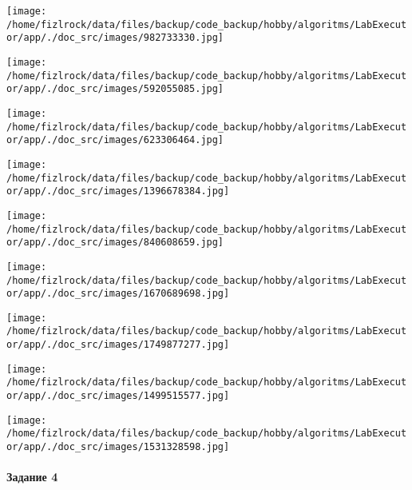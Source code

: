 \documentclass[a4paper, 12pt]{article}
\begin{document}
\texttt{[image: /home/fizlrock/data/files/backup/code\_backup/hobby/algoritms/LabExecutor/app/./doc\_src/images/982733330.jpg]}

\texttt{[image: /home/fizlrock/data/files/backup/code\_backup/hobby/algoritms/LabExecutor/app/./doc\_src/images/592055085.jpg]}

\texttt{[image: /home/fizlrock/data/files/backup/code\_backup/hobby/algoritms/LabExecutor/app/./doc\_src/images/623306464.jpg]}

\texttt{[image: /home/fizlrock/data/files/backup/code\_backup/hobby/algoritms/LabExecutor/app/./doc\_src/images/1396678384.jpg]}

\texttt{[image: /home/fizlrock/data/files/backup/code\_backup/hobby/algoritms/LabExecutor/app/./doc\_src/images/840608659.jpg]}

\texttt{[image: /home/fizlrock/data/files/backup/code\_backup/hobby/algoritms/LabExecutor/app/./doc\_src/images/1670689698.jpg]}

\texttt{[image: /home/fizlrock/data/files/backup/code\_backup/hobby/algoritms/LabExecutor/app/./doc\_src/images/1749877277.jpg]}

\texttt{[image: /home/fizlrock/data/files/backup/code\_backup/hobby/algoritms/LabExecutor/app/./doc\_src/images/1499515577.jpg]}

\texttt{[image: /home/fizlrock/data/files/backup/code\_backup/hobby/algoritms/LabExecutor/app/./doc\_src/images/1531328598.jpg]}
\pagebreak
\paragraph{Задание 4}
\end{document}
